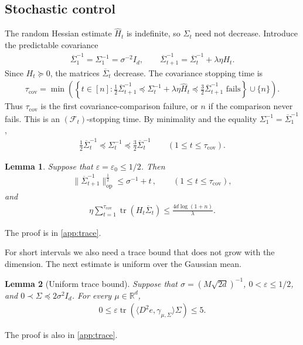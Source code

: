 \documentclass[11pt]{article}
\newtheorem{lemma}[lemma]{Lemma}
\newcommand{\R}{\mathbb R}
\newcommand{\tr}{\operatorname{tr}}
\newcommand{\Lip}{\operatorname{Lip}}
\newcommand{\op}{\mathrm{op}}
\newcommand{\1}{\mathbf 1}
\newcommand{\eps}{\varepsilon}
\begin{document}
\subsection{Stochastic control}
\label{sec:stochastic-control}
The random Hessian estimate $\hat{H}_t$ is indefinite, so $\Sigma_t$ need not decrease.
Introduce the predictable covariance
\begin{align}
    \overline\Sigma_1^{-1}=\Sigma_1^{-1} = \sigma^{-2}I_d,
    \qquad
    \overline\Sigma_{t+1}^{-1}
    =\overline\Sigma_t^{-1}+\lambda\eta H_t.
    \label{eq:predictable-covariance}
\end{align}
Since $H_t\succeq0$, the matrices $\overline\Sigma_t$ decrease.
The covariance stopping time is
\begin{align}
    \tau_{\mathrm{cov}}
    =
    \min\left(
    \left\{
    t \in [n]:
    \frac12 \overline\Sigma_{t+1}^{-1}
    \preceq
    \Sigma_t^{-1}+\lambda\eta\widehat H_t
    \preceq
    \frac32 \overline\Sigma_{t+1}^{-1}
    \text{ fails}
    \right\}
    \cup\{n\}
    \right).
    \label{eq:covariance-stopping-time}
\end{align}
Thus $\tau_{\mathrm{cov}}$ is the first covariance-comparison failure, or $n$
if the comparison never fails.  This is an $(\mathcal F_t)$-stopping time.
By minimality and the equality $\Sigma_1^{-1}=\overline\Sigma_1^{-1}$,
\begin{align}
    \frac12\overline\Sigma_t^{-1}
    \preceq\Sigma_t^{-1}
    \preceq\frac32\overline\Sigma_t^{-1}
    \qquad(1\leq t\leq\tau_{\mathrm{cov}}).
    \label{eq:covariance-comparison}
\end{align}
\begin{lemma}
    \label{lem:trace}
    Suppose that $\eps=\eps_0\leq1/2$. Then
    \begin{align}
        \|\overline\Sigma_{t+1}^{-1}\|_{\op}^{\frac12}
        \leq
        \sigma^{-1}+t\,,
        \qquad(1\leq t\leq \tau_{\mathrm{cov}}),
        \label{eq:predictable-spectrum}
    \end{align}
    and
    \begin{align}
        \eta\sum_{t=1}^{\tau_{\mathrm{cov}}}
        \tr(H_t\overline\Sigma_t)
        \leq\frac{4d\log(1 + n)}{\lambda}.
        \label{eq:trace-budget}
    \end{align}
\end{lemma}
The proof is in \cref{app:trace}.

For short intervals we also need a trace bound that does not grow with
the dimension. The next estimate is uniform over the Gaussian mean.
\begin{lemma}[Uniform trace bound]
    \label{lem:uniform-trace}
    Suppose that $\sigma=(M\sqrt{2d})^{-1}$, $0<\eps\leq1/2$, and
    $0\prec\Sigma\preceq2\sigma^2I_d$. For every $\mu\in\R^d$,
    \begin{align}
        0\leq\eps\tr\left(
        \langle D^2e,\gamma_{\mu,\Sigma}\rangle\Sigma
        \right)\leq5.
        \label{eq:uniform-trace}
    \end{align}
\end{lemma}
The proof is also in \cref{app:trace}.
\end{document}

